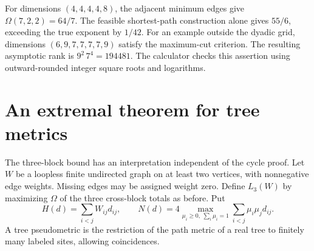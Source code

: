 \documentclass[11pt,a4paper]{article}
\theoremstyle{definition}
\begin{document}
For dimensions \((4,4,4,4,8)\), the adjacent minimum edges give \(\Omega(7,2,2)=64/7\). The feasible shortest-path construction alone gives \(55/6\), exceeding the true exponent by \(1/42\). For an example outside the dyadic grid, dimensions \((6,9,7,7,7,7,9)\) satisfy the maximum-cut criterion. The resulting asymptotic rank is \(9^2\,7^4=194481\). The calculator checks this assertion using outward-rounded integer square roots and logarithms.

\section{An extremal theorem for tree metrics}\label{sec:tree}

The three-block bound has an interpretation independent of the cycle proof. Let \(W\) be a loopless finite undirected graph on at least two vertices, with nonnegative edge weights. Missing edges may be assigned weight zero. Define \(L_3(W)\) by maximizing \(\Omega\) of the three cross-block totals as before. Put
\[
 H(d)=\sum_{i<j}W_{ij}d_{ij},\qquad
 N(d)=4\max_{\mu_i\ge0,\ \sum_i\mu_i=1}\sum_{i<j}\mu_i\mu_jd_{ij}.
\]
A tree pseudometric is the restriction of the path metric of a real tree to finitely many labeled sites, allowing coincidences.
\end{document}
